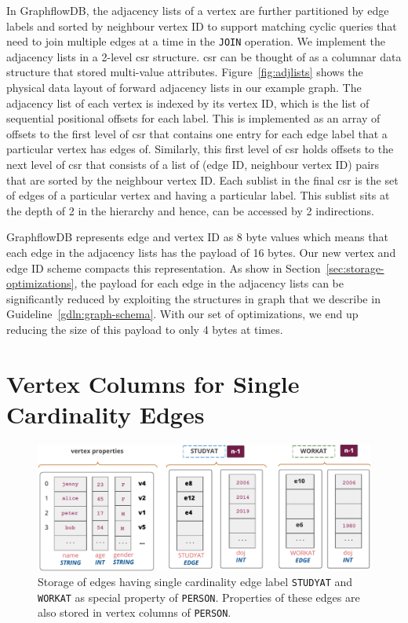 In GraphflowDB, the adjacency lists of a vertex are further partitioned by edge labels and sorted by neighbour vertex ID to support matching cyclic queries that need to join multiple edges at a time in the \texttt{JOIN} operation. We implement the adjacency lists in a 2-level \gls{csr} structure. \gls{csr} can be thought of as a columnar data structure that stored multi-value attributes. Figure~\ref{fig:adjlists} shows the physical data layout of forward adjacency lists in our example graph. The adjacency list of each vertex is indexed by its vertex ID, which is the list of sequential positional offsets for each label. This is implemented as an array of offsets to the first level of \gls{csr} that contains one entry for each edge label that a particular vertex has edges of. Similarly, this first level of \gls{csr} holds offsets to the next level of \gls{csr} that consists of a list of (edge ID, neighbour vertex ID) pairs that are sorted by the neighbour vertex ID. Each sublist in the final \gls{csr} is the set of edges of a particular vertex and having a particular label. This sublist sits at the depth of 2 in the hierarchy and hence, can be accessed by 2 indirections.

GraphflowDB represents edge and vertex ID as 8 byte values which means that each edge in the adjacency lists has the payload of 16 bytes. Our new vertex and edge ID scheme compacts this representation. As show in Section~\ref{sec:storage-optimizations}, the payload for each edge in the adjacency lists can be significantly reduced by exploiting the structures in graph that we describe in Guideline~\ref{gdln:graph-schema}. With our set of optimizations, we end up reducing the size of this payload to only 4 bytes at times.

\section{Vertex Columns for Single Cardinality Edges}
\label{sec:single-cardinality-cols}

\begin{figure}
	\hfill\includegraphics[scale=0.78]{img/single-cardinality-cols}\hspace*{\fill}
	\captionsetup{justification=centering}
	\caption{Storage of edges having single cardinality edge label \texttt{STUDYAT} and \texttt{WORKAT} as special property of \texttt{PERSON}. \hspace{\textwidth} Properties of these edges are also stored in vertex columns of \texttt{PERSON}.}
	\label{fig:single-cardinality-cols}
\end{figure}

